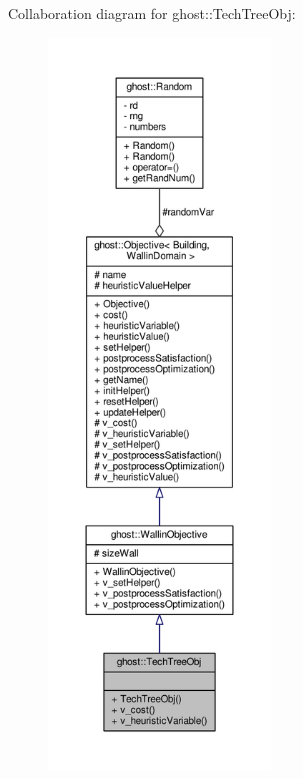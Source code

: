 Collaboration diagram for ghost\-:\-:Tech\-Tree\-Obj\-:\nopagebreak
\begin{figure}[H]
\begin{center}
\leavevmode
\includegraphics[height=550pt]{classghost_1_1TechTreeObj__coll__graph}
\end{center}
\end{figure}
